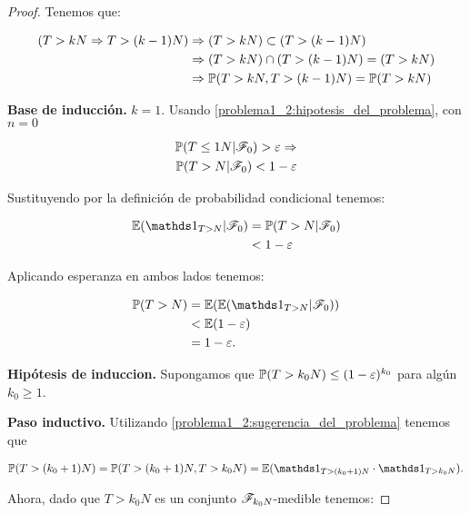 \begin{proof}
	Tenemos que: 
	
	\begin{align}
		\left(T>kN \Rightarrow T>(k-1)N\right) 	&\Rightarrow (T>kN) \subset (T>(k-1)N)          \\ 
                                                &\Rightarrow (T>kN) \cap (T>(k-1)N) = (T>kN)    \\ 
                                                &\Rightarrow \mathbb{P}(T>kN, T>(k-1)N) = \mathbb{P}(T>kN)	
	\end{align}\pn
		
	\textbf{Base de inducción.} $k=1$. Usando \eqref{problema1_2:hipotesis_del_problema}, con $n=0$ 
	
    \begin{align}
		\mathbb{P}(T\leq 1N | \mathscr{F}_0) > \varepsilon\Rightarrow   \\
		\mathbb{P}(T>N| \mathscr{F}_0) < 1 - \varepsilon
	\end{align}\pn
    
	Sustituyendo por la definición de probabilidad condicional tenemos:

    \begin{align}
        \E(\indic_{T>N} | \F_0)	&= \mw(T>N| \F_0) \\
                                &< 1 - \varepsilon
    \end{align}\pn

	Aplicando esperanza en ambos lados tenemos:
    
    \begin{align} 
        \mw(T>N) 	&= 	\E(\E(\indic_{T>N} | \F_0)) \\
                    &< 	\E(1 - \varepsilon)         \\
                    &= 1 - \varepsilon.
    \end{align}\pn
	
	\textbf{Hipótesis de induccion.} 
    Supongamos que $\mathbb{P}(T>k_0N)\leq(1 - \varepsilon)^{k_0}$ para algún $k_0 \geq 1$.\pn
	
	\textbf{Paso inductivo.} 
	Utilizando \eqref{problema1_2:sugerencia_del_problema} tenemos que
    
    \begin{align}
        \mw(T>(k_0+1)N) = \mw(T>(k_0+1)N, T>k_0N) = \E(\indic_{T>(k_0+1)N} \cdot \indic_{T>k_0N}).
    \end{align}\pn
        
	Ahora, dado que $T>k_0N$ es un conjunto $\mathscr{F}_{k_0N}$-medible tenemos:
    

\end{proof}
